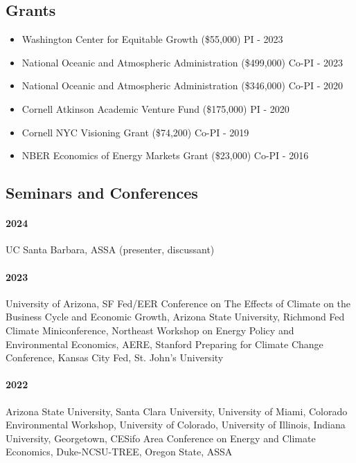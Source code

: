 \documentclass[12pt]{res} %
\begin{document}
\begin{resume}
\vspace{-.2in}

\subsection{Grants}
\begin{itemize}  \itemsep -1pt
	\item[] Washington Center for Equitable Growth (\$55,000) \hfill PI - 2023
	\item[] National Oceanic and Atmospheric Administration (\$499,000) \hfill Co-PI - 2023
	\item[] National Oceanic and Atmospheric Administration (\$346,000) \hfill Co-PI - 2020
	\item[] Cornell Atkinson Academic Venture Fund (\$175,000) \hfill PI - 2020
	\item[] Cornell NYC Visioning Grant (\$74,200) \hfill Co-PI - 2019
	\item[] NBER Economics of Energy Markets Grant (\$23,000) \hfill Co-PI - 2016
\end{itemize}

\vspace{-.2in}

\subsection{Seminars and Conferences}\vspace{-.1in}
\paragraph{2024} UC Santa Barbara, ASSA (presenter, discussant) \vspace{-.2in}
\paragraph{2023} University of Arizona, SF Fed/EER Conference on The Effects of Climate on the Business Cycle and Economic Growth, Arizona State University, Richmond Fed Climate Miniconference, Northeast Workshop on Energy Policy and Environmental Economics, AERE, Stanford Preparing for Climate Change Conference, Kansas City Fed, St. John's University \vspace{-.2in}
\paragraph{2022} Arizona State University, Santa Clara University, University of Miami, Colorado Environmental Workshop, University of Colorado, University of Illinois, Indiana University, Georgetown, CESifo Area Conference on Energy and Climate Economics, Duke-NCSU-TREE, Oregon State, ASSA \vspace{-.2in}

\end{resume}
\end{document}
